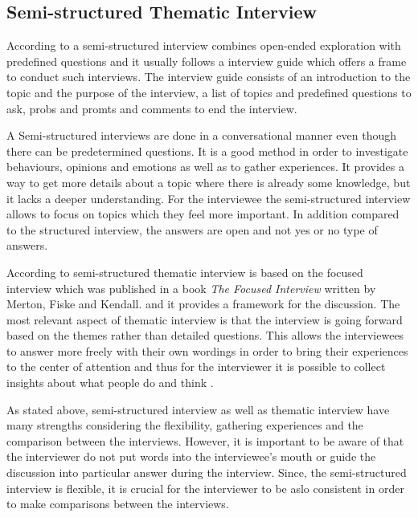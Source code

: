 \subsection{Semi-structured Thematic Interview}

According to \textcite{Wilson:2013} a semi-structured interview combines open-ended exploration with predefined questions and it usually follows a interview guide which offers a frame to conduct such interviews. The interview guide consists of an introduction to the topic and the purpose of the interview, a list of topics and predefined questions to ask, probs and promts and comments to end the interview.

A Semi-structured interviews are done in a conversational manner even though there can be predetermined questions. It is a good method in order to investigate behaviours, opinions and emotions as well as to gather experiences. It provides a way to get more details about a topic where there is already some knowledge, but it lacks a deeper understanding. For the interviewee the semi-structured interview allows to focus on topics which they feel more important. In addition compared to the structured interview, the answers are open and not yes or no type of answers. \parencite{Cliffod:2010,Wilson:2013}

According to \textcite{HH:2001} semi-structured thematic interview is based on the focused interview which was published in a book \emph{The Focused Interview} written by Merton, Fiske and Kendall. and it provides a framework for the discussion. The most relevant aspect of thematic interview is that the interview is going forward based on the themes rather than detailed questions. This allows the interviewees to answer more freely with their own wordings in order to bring their experiences to the center of attention and thus for the interviewer it is possible to collect insights about what people do and think \parencite{Cliffod:2010}.

As stated above, semi-structured interview as well as thematic interview have many strengths considering the flexibility, gathering experiences and the comparison between the interviews. However, it is important to be aware of that the interviewer do not put words into the interviewee's mouth or guide the discussion into particular answer during the interview. Since, the semi-structured interview is flexible, it is crucial for the interviewer to be aslo consistent in order to make comparisons between the interviews. \parencite{Wilson:2013}

